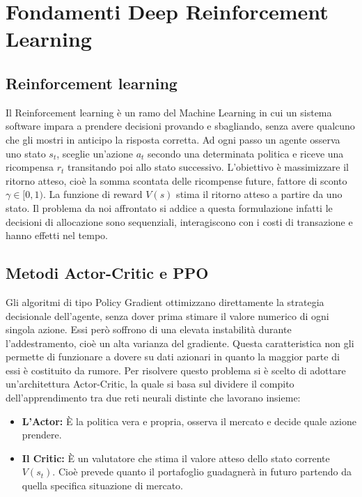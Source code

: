 \section{Fondamenti Deep Reinforcement Learning}
\subsection{Reinforcement learning}
Il Reinforcement learning è un ramo del Machine Learning in cui un sistema software impara a prendere decisioni provando e sbagliando, senza avere qualcuno che gli mostri in anticipo la risposta corretta. Ad ogni passo un agente osserva uno stato $s_t$, sceglie un'azione $a_t$ secondo una determinata politica e riceve una ricompensa $r_t$ transitando poi allo stato successivo.
L'obiettivo è massimizzare il ritorno atteso, cioè la somma scontata delle ricompense future, fattore di sconto $\gamma\in[0,1)$.
La funzione di reward $V(s)$ stima il ritorno atteso a partire da uno stato. 
Il problema da noi affrontato si addice a questa formulazione infatti le decisioni di allocazione sono sequenziali, interagiscono con i costi di transazione e hanno effetti nel tempo.

\subsection{Metodi Actor-Critic e PPO}
Gli algoritmi di tipo Policy Gradient ottimizzano direttamente la strategia decisionale dell'agente, senza dover prima stimare il valore numerico di ogni singola azione.
Essi però soffrono di una elevata instabilità durante l'addestramento, cioè un alta varianza del gradiente. 
Questa caratteristica non gli permette di funzionare a dovere su dati azionari in quanto la maggior parte di essi è costituito da rumore.
Per risolvere questo problema si è scelto di adottare un'architettura Actor-Critic, la quale si basa sul dividere il compito dell'apprendimento tra due reti neurali distinte che lavorano insieme:

\begin{itemize}
    \item \textbf{L'Actor:} È la politica vera e propria, osserva il mercato e decide quale azione prendere.
    \item \textbf{Il Critic:} È un valutatore che stima il valore atteso dello stato corrente $V(s_t)$. Cioè prevede quanto il portafoglio guadagnerà in futuro partendo da quella specifica situazione di mercato.
\end{itemize}

